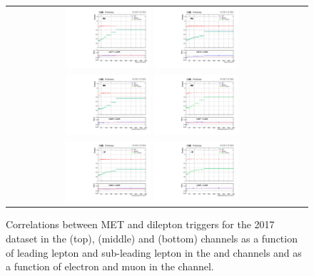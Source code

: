 \begin{figure}[!htb]
  \begin{center}
    \begin{tabular}{cc}
      \includegraphics[width=0.30\textwidth]{fig_2017_TrigSF/g_lepApt_emu_alpha.pdf}
      \includegraphics[width=0.30\textwidth]{fig_2017_TrigSF/g_lepBpt_emu_alpha.pdf}\\
      \includegraphics[width=0.30\textwidth]{fig_2017_TrigSF/g_lepApt_ee_alpha.pdf}
      \includegraphics[width=0.30\textwidth]{fig_2017_TrigSF/g_lepBpt_ee_alpha.pdf}\\
      \includegraphics[width=0.30\textwidth]{fig_2017_TrigSF/g_lepApt_mumu_alpha.pdf}
      \includegraphics[width=0.30\textwidth]{fig_2017_TrigSF/g_lepBpt_mumu_alpha.pdf}\\
    \end{tabular}
    \caption{Correlations between MET and dilepton triggers for the 2017 dataset in the \emu (top), \ee (middle) and \mumu (bottom) channels as a function of leading lepton \pT and sub-leading lepton \pT in the \ee and \mumu channels and as a function of electron \pT and muon \pT in the \emu channel.}
    \label{TrigSF_2017_5}
  \end{center}
\end{figure}


